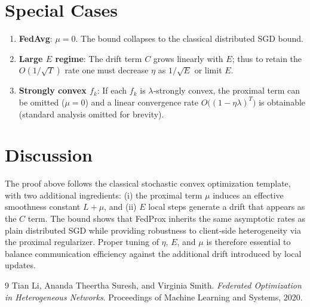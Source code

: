 \documentclass[11pt]{article}
\begin{document}
\section*{Special Cases}
\begin{enumerate}
    \item \textbf{FedAvg}: $\mu=0$. The bound collapses to the classical
          distributed SGD bound.
    \item \textbf{Large $E$ regime}: The drift term $C$ grows linearly with $E$;
          thus to retain the $O(1/\sqrt{T})$ rate one must decrease $\eta$ as
          $1/\sqrt{E}$ or limit $E$.
    \item \textbf{Strongly convex $f_k$}: If each $f_k$ is $\lambda$‑strongly convex,
          the proximal term can be omitted ($\mu=0$) and a linear convergence
          rate $O\bigl((1-\eta\lambda)^{T}\bigr)$ is obtainable (standard
          analysis omitted for brevity).
\end{enumerate}

\section*{Discussion}
The proof above follows the classical stochastic convex optimization template,
with two additional ingredients: (i) the proximal term $\mu$ induces an
effective smoothness constant $L+\mu$, and (ii) $E$ local steps generate a
drift that appears as the $C$ term. The bound shows that FedProx inherits the
same asymptotic rates as plain distributed SGD while providing robustness to
client‑side heterogeneity via the proximal regularizer. Proper tuning of
$\eta$, $E$, and $\mu$ is therefore essential to balance communication efficiency
against the additional drift introduced by local updates.

\begin{thebibliography}{9}
Tian Li, Ananda Theertha Suresh, and Virginia Smith.
\newblock \emph{Federated Optimization in Heterogeneous Networks}.
\newblock Proceedings of Machine Learning and Systems, 2020.
\end{thebibliography}
\end{document}
